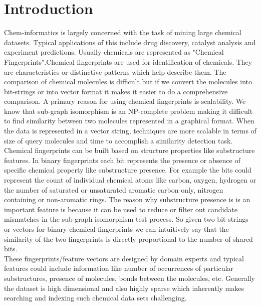 
%
%

\section{Introduction}
Chem-informatics is largely concerned with the task of mining large chemical datasets. Typical applications of this include drug discovery, catalyst analysis and experiment predictions. Usually chemicals are represented as "Chemical Fingerprints".Chemical fingerprints are used for identification of chemicals. They are characteristics or distinctive patterns which help describe them. The comparison of chemical molecules is difficult but if we convert the molecules into bit-strings or into vector format it makes it easier to do a comprehensive comparison. A primary reason for using chemical fingerprints is scalability. We know that sub-graph isomorphism is an NP-complete problem making it difficult to find similarity between two molecules represented in a graphical format. When the data is represented in a vector string, techniques are more scalable in terms of size of query molecules and time to accomplish a similarity detection task.\\

Chemical fingerprints can be built based on structure properties like substructure features. In binary fingerprints each bit represents the presence or absence of specific chemical property like substructure presence. For example the bits could represent the count of individual chemical atoms like carbon, oxygen, hydrogen or the number of saturated or unsaturated aromatic carbon only, nitrogen containing or non-aromatic rings. The reason why substructure presence is is an important feature is because it can be used to reduce or filter out candidate mismatches in the sub-graph isomorphism test process. So given two bit-strings or vectors for binary chemical  fingerprints we can intuitively say that the similarity of the two fingerprints is directly proportional to the number of shared bits. \\

	These fingerprints/feature vectors are designed by domain experts and typical features could include information like number of occurrences of particular substructures, presence of molecules, bonds between the molecules, etc. Generally the dataset is high dimensional and also highly sparse which inherently makes searching and indexing such chemical data sets challenging. \\
	
